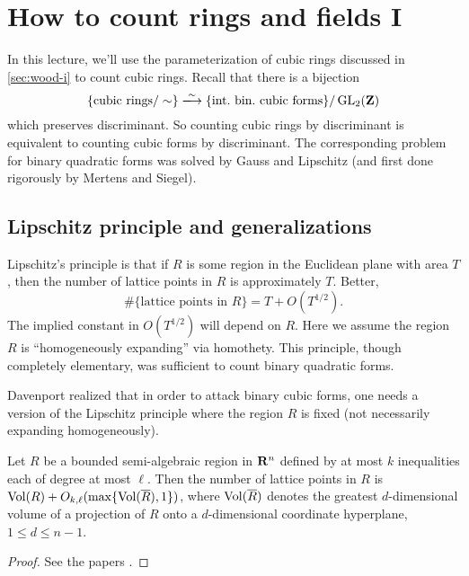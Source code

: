 
\section{How to count rings and fields I}





In this lecture, we'll use the parameterization of cubic rings discussed in 
\autoref{sec:wood-i} to count cubic rings. Recall that there is a bijection 
\[
  \{\text{cubic rings}/\sim\} \iso \{\text{int.~bin.~cubic forms}\} /\generallinear_2(\dZ) 
\]
which preserves discriminant. So counting cubic rings by discriminant is 
equivalent to counting cubic forms by discriminant. The corresponding problem 
for binary quadratic forms was solved by Gauss and Lipschitz (and first done 
rigorously by Mertens and Siegel). 





\subsection{Lipschitz principle and generalizations}

Lipschitz's principle is that if $R$ is some region in the Euclidean plane with 
area $T$, then the number of lattice points in $R$ is approximately $T$. 
Better, 
\[
  \# \{\text{lattice points in }R\} = T + O(T^{1/2}) .
\]
The implied constant in $O(T^{1/2})$ will depend on $R$. Here we assume the 
region $R$ is ``homogeneously expanding'' via homothety. This principle, though 
completely elementary, was sufficient to count binary quadratic forms. 

Davenport realized that in order to attack binary cubic forms, one needs a 
version of the Lipschitz principle where the region $R$ is fixed (not 
necessarily expanding homogeneously). 

\begin{theo}[Davenport] 
Let $R$ be a bounded semi-algebraic region in $\mathbf{R}^n$ defined by at most $k$ 
inequalities each of degree at most $\ell$. Then the number of lattice points 
in $R$ is $\operatorname{Vol}(R)+O_{k,\ell}(\max\{\operatorname{Vol}(\overline R),1\})$, where 
$\operatorname{Vol}(\overline R)$ denotes the greatest $d$-dimensional volume of a 
projection of $R$ onto a $d$-dimensional coordinate hyperplane, 
$1\leqslant d\leqslant n-1$. 
\end{theo}
\begin{proof}
See the papers \cite{d51,d64}. 
\end{proof}

